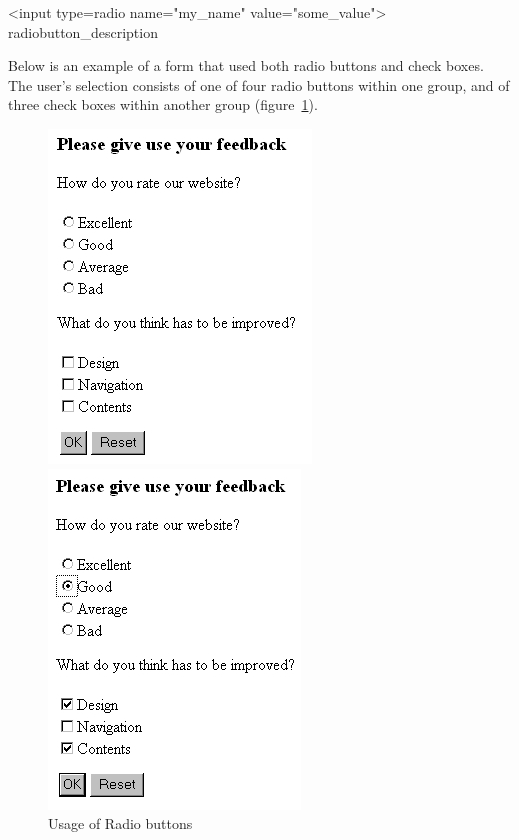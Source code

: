 \begin{java}
<input type=radio name="my\_name" value="some\_value">\\
radiobutton\_description\\
\end{java}

Below is an example of a form that used both radio buttons and check
boxes. The user's selection consists of one of four radio buttons within
one group, and of three check boxes within another group 
(figure~\ref{Feedback}).

\begin{figure}[t]

\begin{minipage}[b]{0.49\linewidth}
\begin{center}
\includegraphics[clip,width=0.5\linewidth]{pics/modules/44}
\end{center}
\end{minipage}
\hfill
\begin{minipage}[b]{0.49\linewidth}
\begin{center}
\includegraphics[clip,width=0.5\linewidth]{pics/modules/45}
\end{center}
\end{minipage}

\caption[Usage of Radio buttons]{Usage of Radio buttons}
\label{Feedback}

\end{figure}

